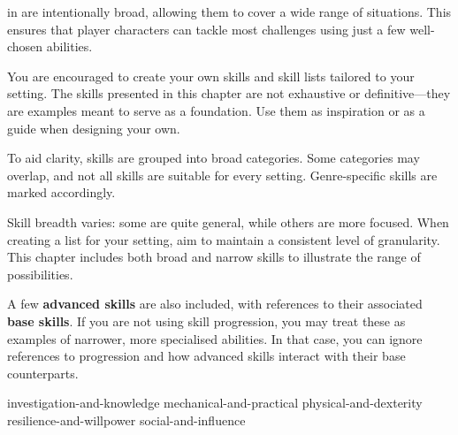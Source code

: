  in \wyrd{} are intentionally broad, allowing them to cover a wide range of situations. This ensures that player characters can tackle most challenges using just a few well-chosen abilities.

You are encouraged to create your own skills and skill lists tailored to your setting. The skills presented in this chapter are not exhaustive or definitive—they are examples meant to serve as a foundation. Use them as inspiration or as a guide when designing your own.

To aid clarity, skills are grouped into broad categories. Some categories may overlap, and not all skills are suitable for every setting. Genre-specific skills are marked accordingly.

Skill breadth varies: some are quite general, while others are more focused. When creating a list for your setting, aim to maintain a consistent level of granularity. This chapter includes both broad and narrow skills to illustrate the range of possibilities.

A few \textbf{advanced skills} are also included, with references to their associated \textbf{base skills}. If you are not using skill progression, you may treat these as examples of narrower, more specialised abilities. In that case, you can ignore references to progression and how advanced skills interact with their base counterparts.


{investigation-and-knowledge}
{mechanical-and-practical}
{physical-and-dexterity}
{resilience-and-willpower}
{social-and-influence}